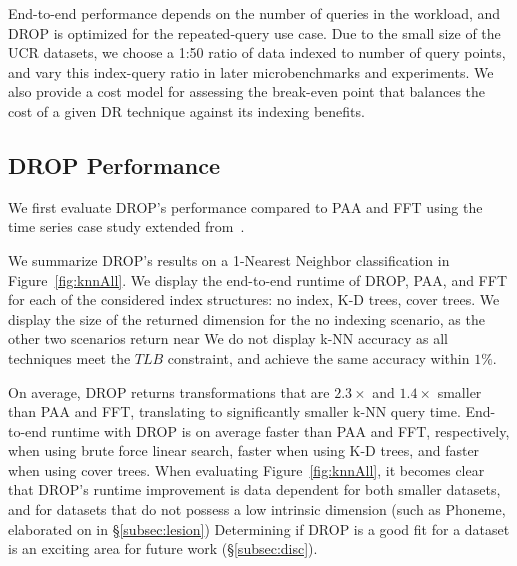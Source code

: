 End-to-end performance depends on the number of queries in the workload, and DROP is optimized for the repeated-query use case. 
Due to the small size of the UCR datasets, we choose a 1:50 ratio of data indexed to number of query points, and vary this index-query ratio in later microbenchmarks and experiments. 
We also provide a cost model for assessing the break-even point that balances the cost of a given DR technique against its indexing benefits.



\subsection{DROP Performance}
\label{subsec:runtime}


We first evaluate DROP's performance compared to PAA and FFT using the time series case study extended from~\cite{keogh-study}. 

 We summarize DROP's results on a 1-Nearest Neighbor classification in Figure~\ref{fig:knnAll}.
We display the end-to-end runtime of DROP, PAA, and FFT for each of the considered index structures: no index, K-D trees, cover trees. 
We display the size of the returned dimension for the no indexing scenario, as the other two scenarios return near 
We do not display k-NN accuracy as all techniques meet the $TLB$ constraint, and achieve the same accuracy within $1\%$.

On average, DROP returns transformations that are $2.3\times$ and  $1.4\times$ smaller than PAA and FFT, translating to significantly smaller k-NN query time. 
End-to-end runtime with DROP is on average  faster than PAA and FFT, respectively, when using brute force linear search,    faster when using K-D trees, and  faster when using cover trees.
When evaluating Figure~\ref{fig:knnAll}, it becomes clear that DROP's runtime improvement is data dependent for both smaller datasets, and for datasets that do not possess a low intrinsic dimension (such as Phoneme, elaborated on in \S\ref{subsec:lesion})
Determining if DROP is a good fit for a dataset is an exciting area for future work (\S\ref{subsec:disc}).

